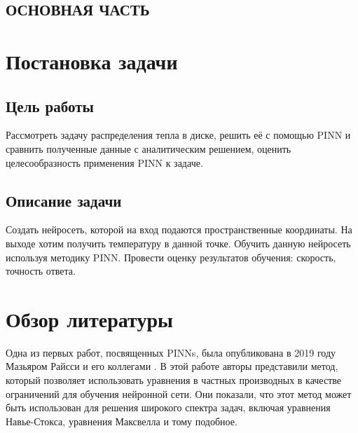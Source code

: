 \documentclass[a4paper,14pt]{extarticle} %
\def\oldcite{} \let\oldcite=\cite
\def\cite{\stepcounter{citesnum}\oldcite}
\begin{document}
\newpage
\begin{center} 
    \section*{ОСНОВНАЯ ЧАСТЬ}
\end{center}

\section{Постановка задачи}

\subsection{Цель работы}


Рассмотреть задачу распределения тепла в диске, решить её с помощью PINN и сравнить полученные данные с аналитическим решением, оценить целесообразность применения PINN к задаче.

\subsection{Описание задачи}

Создать нейросеть, которой на вход подаются пространственные координаты. На выходе хотим получить температуру в данной точке. Обучить данную нейросеть используя методику PINN. Провести оценку результатов обучения: скорость, точность ответа.

\section{Обзор литературы}


Одна из первых работ, посвященных PINNs, была опубликована в 2019 году Мазьяром Райсси и его коллегами \cite{bib:pinn:first}. В этой работе авторы представили метод, который позволяет использовать уравнения в частных производных в качестве ограничений для обучения нейронной сети. Они показали, что этот метод может быть использован для решения широкого спектра задач, включая уравнения Навье-Стокса, уравнения Максвелла и тому подобное.
\end{document}
